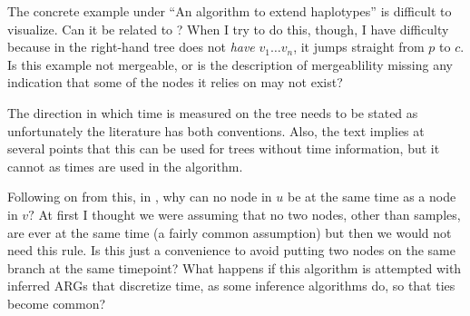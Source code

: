\begin{point}{} %
The concrete example under ``An algorithm to extend haplotypes'' is
difficult to visualize. Can it be related to ? When I try to
do this, though, I have difficulty because in  the right-hand
tree does not \emph{have} $v_1 \ldots v_n$, it jumps straight from $p$ to $c.$ Is
this example not mergeable, or is the description of mergeablility
missing any indication that some of the nodes it relies on may not
exist?
\end{point}


\begin{point}{} %
The direction in which time is measured on the tree needs to be stated
as unfortunately the literature has both conventions. Also, the text
implies at several points that this can be used for trees without
time information, but it cannot as times are used in the algorithm.
\end{point}


\begin{point}{}
Following on from this, in , why can no node in $u$ be at the
same time as a node in $v?$ At first I thought we were assuming that no
two nodes, other than samples, are ever at the same time (a fairly
common assumption) but then we would not need this rule. Is this just
a convenience to avoid putting two nodes on the same branch at the same
timepoint? What happens if this algorithm is attempted with inferred
ARGs that discretize time, as some inference algorithms do, so that ties
become common?
\end{point}


